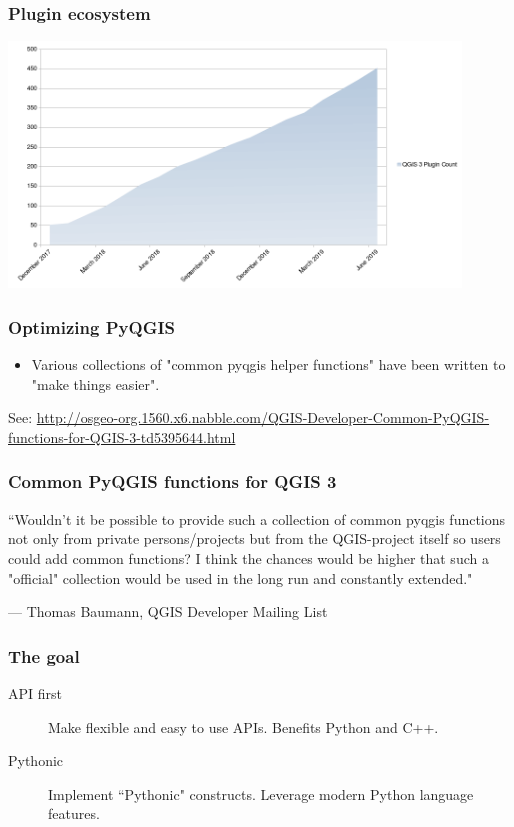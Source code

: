 \begin{frame}
\frametitle{Plugin ecosystem}
	\includegraphics[width=0.9\textwidth]{img/qgis_plugin_count.png}
\end{frame}

\begin{frame}
\frametitle{Optimizing PyQGIS}

\begin{itemize}
	\item Various collections of "common pyqgis helper functions" have been written to "make things easier".
\end{itemize}

See: \url{http://osgeo-org.1560.x6.nabble.com/QGIS-Developer-Common-PyQGIS-functions-for-QGIS-3-td5395644.html}
\end{frame}

\begin{frame}
\frametitle{Common PyQGIS functions for QGIS 3}
\epigraph{``Wouldn't it be possible to provide such a collection of common pyqgis functions not only from private persons/projects but from the QGIS-project itself so users could add common functions?
I think the chances would be higher that such a "official" collection would be used in the long run and constantly extended."}{--- Thomas Baumann, QGIS Developer Mailing List}
\end{frame}

\begin{frame}
\frametitle{The goal}
\begin{description}
	\item [API first] Make flexible and easy to use APIs. Benefits Python and C++.
	\item [Pythonic] Implement ``Pythonic" constructs. Leverage modern Python language features.
\end{description}
\end{frame}